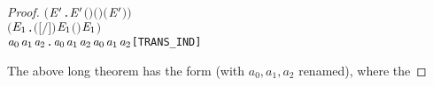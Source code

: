 \begin{proof}
\begin{alltt}
       \ensuremath{(}\HOLSymConst{\HOLTokenForall{}}  \ensuremath{\HOLBoundVar{E}\sp{\prime}} .    \ensuremath{\HOLBoundVar{E}\sp{\prime}} \HOLSymConst{\HOLTokenImp{}}  \ensuremath{(}  \ensuremath{)} \ensuremath{(}  \ensuremath{)} \ensuremath{(} \ensuremath{\HOLBoundVar{E}\sp{\prime}} \ensuremath{)}\ensuremath{)} \HOLSymConst{\HOLTokenConj{}}
       \ensuremath{(}\HOLSymConst{\HOLTokenForall{}}   \ensuremath{\HOLBoundVar{E}\sb{\mathrm{1}}}.  \ensuremath{(}\ensuremath{[}  \ensuremath{/}\ensuremath{]} \ensuremath{)}  \ensuremath{\HOLBoundVar{E}\sb{\mathrm{1}}} \HOLSymConst{\HOLTokenImp{}}  \ensuremath{(}  \ensuremath{)}  \ensuremath{\HOLBoundVar{E}\sb{\mathrm{1}}}\ensuremath{)} \HOLSymConst{\HOLTokenImp{}}
       \HOLSymConst{\HOLTokenForall{}}\ensuremath{\HOLBoundVar{a}\sb{\mathrm{0}}} \ensuremath{\HOLBoundVar{a}\sb{\mathrm{1}}} \ensuremath{\HOLBoundVar{a}\sb{\mathrm{2}}}. \ensuremath{\HOLBoundVar{a}\sb{\mathrm{0}}} \HOLTokenTransBegin\ensuremath{\HOLBoundVar{a}\sb{\mathrm{1}}}\HOLTokenTransEnd \ensuremath{\HOLBoundVar{a}\sb{\mathrm{2}}} \HOLSymConst{\HOLTokenImp{}}  \ensuremath{\HOLBoundVar{a}\sb{\mathrm{0}}} \ensuremath{\HOLBoundVar{a}\sb{\mathrm{1}}} \ensuremath{\HOLBoundVar{a}\sb{\mathrm{2}}}\hfill{[TRANS_IND]}
\end{alltt}
The above long theorem has the form  (with $a_0, a_1, a_2$ renamed), where the

\end{proof}
